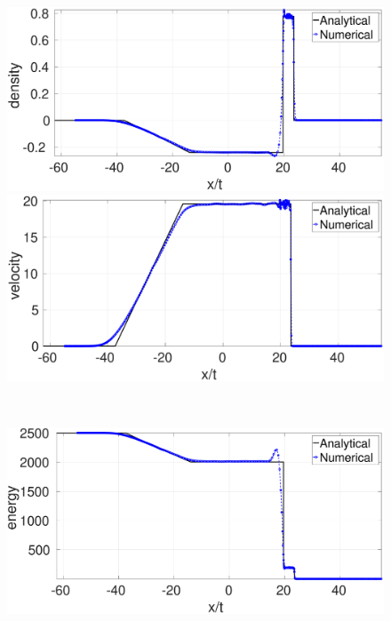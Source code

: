 \documentclass[review]{elsarticle}
\begin{document}
\begin{figure}[htp]
    \centering
    \begin{minipage}{.495\textwidth}
        \centering
        \includegraphics[width=0.99 \textwidth]{./Figures/strong-blast/StrBlst-RCM-rho-Rp3}
    \end{minipage}%
    \begin{minipage}{.495 \textwidth}
        \centering
        \includegraphics[width=0.99 \textwidth]{./Figures/strong-blast/StrBlst-RCM-v-Rp3}
    \end{minipage}%
    \\
    \begin{minipage}{.495 \textwidth}
        \centering
        \includegraphics[width=0.99 \textwidth]{./Figures/strong-blast/StrBlst-RCM-e-Rp3}

\end{minipage}
\end{figure}
\end{document}
